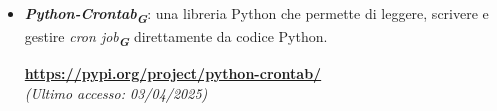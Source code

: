\begin{itemize}
    \item \textbf{\emph{Python-Crontab}\textsubscript{\textit{\textbf{G}}}}: una libreria Python che permette di leggere, scrivere e gestire {\emph{cron job}\textsubscript{\textit{\textbf{G}}}} direttamente da codice Python.
    \begin{center}
        \textbf{\url{https://pypi.org/project/python-crontab/}} \\
        \emph{(Ultimo accesso: 03/04/2025)}
    \end{center}
   
\end{itemize}


